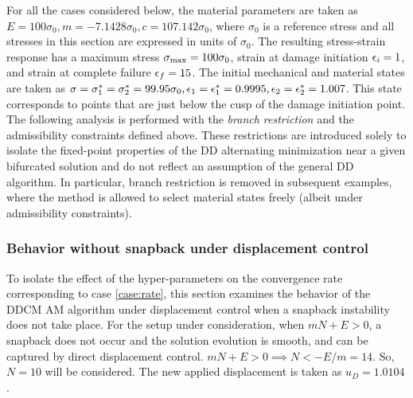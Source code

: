 \documentclass[10pt]{cas-sc}
\newcommand{\deleted}[1]{}
\newcommand{\added}[1]{#1}
\newenvironment{addedblock}{}{}
\begin{document}
\begin{addedblock}
For all the cases considered below, the material parameters are taken as $ E=100 \sigma_0, m=-7.1428 \sigma_0, c=107.142 \sigma_0$, where $\sigma_0$ is a reference stress and all stresses in this section are expressed in units of $\sigma_0$. The resulting stress-strain response has a maximum stress ${\sigma}_{\rm max} = 100 \sigma_0$, strain at damage initiation ${\epsilon}_i=1$, and strain at complete failure ${\epsilon}_f=15$. The initial mechanical and material states are taken as ${\sigma}={\sigma}_1^*={\sigma}_2^*=99.95\sigma_0,{\epsilon}_1={\epsilon}_1^* =0.9995,{\epsilon}_2={\epsilon}_2^* =1.007$. This state corresponds to points that are just below the cusp of the damage initiation point. The following analysis is performed with the \textit{branch restriction} and the admissibility constraints defined above. These restrictions are introduced solely to isolate the fixed-point properties of the DD alternating minimization near a given bifurcated solution and do not reflect an assumption of the general DD algorithm. In particular, branch restriction is removed in subsequent examples, where the method is allowed to select material states freely (albeit under admissibility constraints).
\end{addedblock}


\subsubsection*{Behavior without snapback under displacement control}
\added{To isolate the effect of the hyper-parameters on the convergence rate corresponding to case \ref{case:rate}, this section examines the behavior of the DDCM AM algorithm under displacement control when a snapback instability does not take place. For the setup under consideration, when $mN+E >0$, a snapback does not occur and the solution evolution is smooth, and can be captured by direct displacement control. $mN+E >0 \implies N < -E/m = 14$. So, $N=10$ will be considered. The new applied displacement is taken as $u_D=1.0104$.}
\deleted{A snapback is not expected to occur when the mesh size, and hence the localization length, is \textit{large enough}. This is the case when $N=10$. Direct displacement control can be used in this case. The new applied displacement is taken as $u_D=1.0104$. The solution evolution is continuous. }
\end{document}
